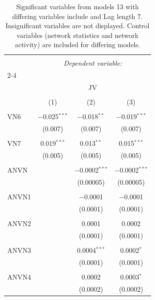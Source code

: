 
\begin{table}[!htbp] \centering 
  \caption{Significant variables from models 13 with differing variables include 
                               and Lag length 7. Insignificant variables are not displayed. 
                               Control variables (network statistics and network activity) are 
                               included for differing models.} 
  \label{Jmodels2_t} 
\scriptsize 
\begin{tabular}{@{\extracolsep{5pt}}lccc} 
\\[-1.8ex]\hline 
\hline \\[-1.8ex] 
 & \multicolumn{3}{c}{\textit{Dependent variable:}} \\ 
\cline{2-4} 
\\[-1.8ex] & \multicolumn{3}{c}{JV} \\ 
\\[-1.8ex] & (1) & (2) & (3)\\ 
\hline \\[-1.8ex] 
 VN6 & $-$0.025$^{***}$ & $-$0.018$^{**}$ & $-$0.019$^{***}$ \\ 
  & (0.007) & (0.007) & (0.007) \\ 
  & & & \\ 
 VN7 & 0.019$^{***}$ & 0.013$^{**}$ & 0.015$^{***}$ \\ 
  & (0.005) & (0.005) & (0.005) \\ 
  & & & \\ 
 ANVN &  & $-$0.0002$^{***}$ & $-$0.0002$^{***}$ \\ 
  &  & (0.00005) & (0.00005) \\ 
  & & & \\ 
 ANVN1 &  & $-$0.0001 & $-$0.0001 \\ 
  &  & (0.0001) & (0.0001) \\ 
  & & & \\ 
 ANVN2 &  & 0.0001 & 0.0002 \\ 
  &  & (0.0001) & (0.0001) \\ 
  & & & \\ 
 ANVN3 &  & 0.0004$^{***}$ & 0.0002$^{*}$ \\ 
  &  & (0.0001) & (0.0001) \\ 
  & & & \\ 
 ANVN4 &  & 0.0002 & 0.0003$^{*}$ \\ 
  &  & (0.0002) & (0.0002) \\ 

\end{tabular}
\end{table}
